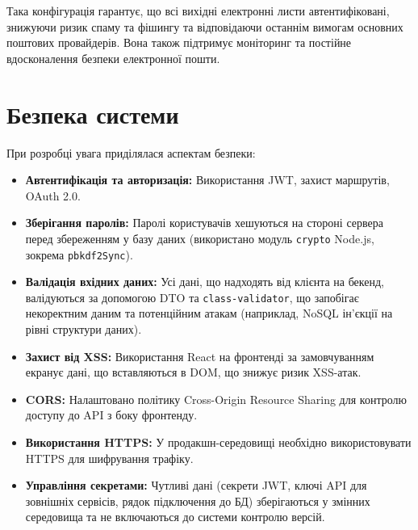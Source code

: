 Така конфігурація гарантує, що всі вихідні електронні листи автентифіковані, знижуючи ризик спаму та фішингу та відповідаючи останнім вимогам основних поштових провайдерів. Вона також підтримує моніторинг та постійне вдосконалення безпеки електронної пошти.

\section{Безпека системи}
\label{sec:security_considerations}
При розробці увага приділялася аспектам безпеки:
\begin{itemize}
    \item \textbf{Автентифікація та авторизація:} Використання JWT, захист маршрутів, OAuth 2.0.
    \item \textbf{Зберігання паролів:} Паролі користувачів хешуються на стороні сервера перед збереженням у базу даних (використано модуль \texttt{crypto} Node.js, зокрема \texttt{pbkdf2Sync}).
    \item \textbf{Валідація вхідних даних:} Усі дані, що надходять від клієнта на бекенд, валідуються за допомогою DTO та \texttt{class-validator}, що запобігає некоректним даним та потенційним атакам (наприклад, NoSQL ін'єкції на рівні структури даних).
    \item \textbf{Захист від XSS:} Використання React на фронтенді за замовчуванням екранує дані, що вставляються в DOM, що знижує ризик XSS-атак.
    \item \textbf{CORS:} Налаштовано політику Cross-Origin Resource Sharing для контролю доступу до API з боку фронтенду.
    \item \textbf{Використання HTTPS:} У продакшн-середовищі необхідно використовувати HTTPS для шифрування трафіку.
    \item \textbf{Управління секретами:} Чутливі дані (секрети JWT, ключі API для зовнішніх сервісів, рядок підключення до БД) зберігаються у змінних середовища та не включаються до системи контролю версій.
\end{itemize} 